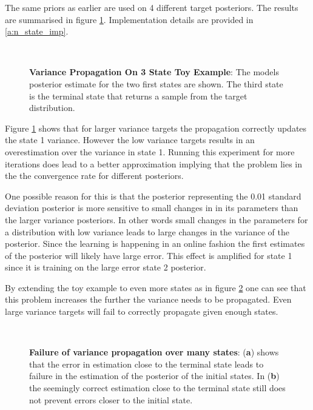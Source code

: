 The same priors as earlier are used on 4 different target posteriors. The results are summarised in figure \ref{fig:3stateproptest}. Implementation details are provided in \ref{a:n_state_imp}.

\begin{figure}[H]
    \centering

    \\
    \caption{\textbf{Variance Propagation On 3 State Toy Example}: The models posterior estimate for the two first states are shown. The third state is the terminal state that returns a sample from the target distribution.}
    \label{fig:3stateproptest}
\end{figure}

Figure \ref{fig:3stateproptest} shows that for larger variance targets the propagation correctly updates the state 1 variance. However the low variance targets results in an overestimation over the variance in state 1. Running this experiment for more iterations does lead to a better approximation implying that the problem lies in the the convergence rate for different posteriors. 

One possible reason for this is that the posterior representing the 0.01 standard deviation posterior is more sensitive to small changes in in its parameters than the larger variance posteriors. In other words small changes in the parameters for a distribution with low variance leads to large changes in the variance of the posterior. Since the learning is happening in an online fashion the first estimates of the posterior will likely have large error. This effect is amplified for state 1 since it is training on the large error state 2 posterior.

By extending the toy example to even more states as in figure \ref{fig:longproptest} one can see that this problem increases the further the variance needs to be propagated. Even large variance targets will fail to correctly propagate given enough states.

\begin{figure}[H]
    \centering
    \\
    \caption{\textbf{Failure of variance propagation over many states}: (\textbf{a}) shows that the error in estimation close to the terminal state leads to failure in the estimation of the posterior of the initial states. In (\textbf{b}) the seemingly correct estimation close to the terminal state still does not prevent errors closer to the initial state.}
    \label{fig:longproptest}
\end{figure}


